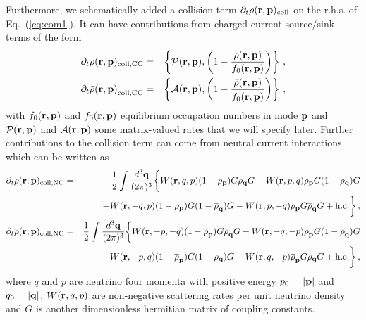 \documentclass[prd,aps]{revtex4-2}
\begin{document}
Furthermore, we schematically
added a collision term $\partial_t \rho({\bf r},{\bf p})_{\rm coll}$ on the r.h.s. of Eq.~(\ref{eq:eom1}).
It can have contributions from charged current source/sink terms of the form
\begin{eqnarray}
\partial_t \rho({\bf r},{\bf p})_{\rm coll,CC}&=&\left\{{\cal P}({\bf r},{\bf p}),\left(1-{\rho({\bf r},{\bf p})
  \over f_0({\bf r},{\bf p})}\right)\right\}\,,\nonumber\\
\partial_t{\bar\rho({\bf r},{\bf p})}_{\rm coll,CC}&=&\left\{{\cal A}({\bf r},{\bf p}),
  \left(1-{\bar\rho({\bf r},{\bf p})\over\bar
  f_0({\bf r},{\bf p})}\right)\right\}\,,\label{eq:kin_cc}
\end{eqnarray}
with $f_0({\bf r},{\bf p})$ and $\bar f_0({\bf r},{\bf p})$ equilibrium occupation numbers in mode ${\bf p}$
and ${\cal P}({\bf r},{\bf p})$ and ${\cal A}({\bf r},{\bf p})$ some matrix-valued rates that we will specify later.
Further contributions to the collision term can come from
neutral current interactions which can be written as
\begin{eqnarray}
\partial_t\rho({\bf r},{\bf p})_{\rm coll,NC}&=&
  {1\over 2}\int\frac{d^3{\bf q}}{(2\pi)^3}\biggl\{W({\bf r},q,p)
    (1-\rho_{\bf p})G\rho_{\bf q}G-W({\bf r},p,q)
    \rho_{\bf p}G(1-\rho_{\bf q})G\nonumber\\
  &&\hskip-5em+W({\bf r},-q,p)(1-\rho_{\bf p})
  G(1-\overline\rho_{\bf q})G
    -W({\bf r},p,-q)\rho_{\bf p}G\overline\rho_{\bf q}G+{\rm h.c.}
    \biggr\}\label{eq:kin_nc}\,,\\
\partial_t\overline\rho({\bf r},{\bf p})_{\rm coll,NC}&=&
  {1\over 2}\int\frac{d^3{\bf q}}{(2\pi)^3}\biggl\{W({\bf r},-p,-q)
    (1-\overline\rho_{\bf p})G\overline\rho_{\bf q}G-
    W({\bf r},-q,-p)\overline\rho_{\bf p}G(1-\overline\rho_{\bf q})G\nonumber\\
  &&\hskip-5em+W({\bf r},-p,q)(1-\overline\rho_{\bf p})G
    (1-\rho_{\bf q})G-
    W({\bf r},q,-p)\overline\rho_{\bf p}G\rho_{\bf q}G+{\rm h.c.}
    \biggr\}\,,\nonumber
\end{eqnarray}
where $q$ and $p$ are neutrino four momenta with positive energy $p_0=\vert{\bf p}\vert$ and $q_0=\vert{\bf q}\vert$,
$W({\bf r},q,p)$ are non-negative scattering rates per unit neutrino density and $G$ is another dimensionless hermitian matrix of coupling constants.
\end{document}
